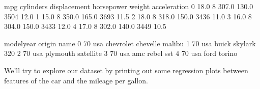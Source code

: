 \documentclass[letterpaper,10pt,english]{jupyterBook}
\begin{document}
\begin{sphinxVerbatim}[commandchars=\\\{\}]
\end{sphinxVerbatim}

\begin{sphinxVerbatim}[commandchars=\\\{\}]
    mpg  cylinders  displacement  horsepower  weight  acceleration  \PYGZbs{}
0  18.0          8         307.0       130.0    3504          12.0   
1  15.0          8         350.0       165.0    3693          11.5   
2  18.0          8         318.0       150.0    3436          11.0   
3  16.0          8         304.0       150.0    3433          12.0   
4  17.0          8         302.0       140.0    3449          10.5   

   model\PYGZus{}year origin                       name  
0          70    usa  chevrolet chevelle malibu  
1          70    usa          buick skylark 320  
2          70    usa         plymouth satellite  
3          70    usa              amc rebel sst  
4          70    usa                ford torino  
\end{sphinxVerbatim}

\sphinxAtStartPar
We’ll try to explore our dataset by printing out some regression plots between features of the car and the mileage per gallon.

\begin{sphinxVerbatim}[commandchars=\\\{\}]
\PYG{p}{[}\PYG{p}{]} \PYG{p}{[}\PYG{p}{]}
   \PYG{p}{[}\PYG{p}{]} \PYG{p}{[}\PYG{p}{]}
    
\end{sphinxVerbatim}
\end{document}

